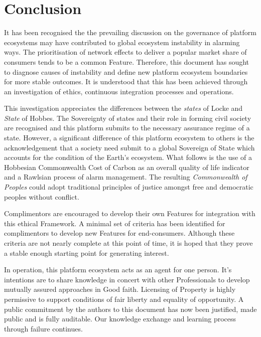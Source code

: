 \documentclass[11pt, oneside]{article}   	%
\begin{document}
\pagebreak

\section{Conclusion}
It has been recognised the the prevailing discussion on the governance of platform ecosystems may have contributed to global ecosystem instability in alarming ways.
The prioritisation of network effects to deliver a popular market share of consumers tends to be a common Feature.
Therefore, this document has sought to diagnose causes of instability and define new platform ecosystem boundaries for more stable outcomes.
It is understood that this has been achieved through an investigation of ethics, continuous integration processes and operations.\

This investigation appreciates the differences between the \emph{states} of Locke and \emph{State} of Hobbes.
The Sovereignty of states and their role in forming civil society are recognised and this platform submits to the necessary assurance regime of a state.
However, a significant difference of this platform ecosystem to others is the acknowledgement that a society need submit to a global Sovereign of State which accounts for the condition of the Earth's ecosystem.
What follows is the use of a Hobbesian Commonwealth Cost of Carbon as an overall quality of life indicator and a Rawlsian process of alarm management.
The resulting \emph{Commonwealth of Peoples} could adopt traditional principles of justice amongst free and democratic peoples without conflict.\

Complimentors are encouraged to develop their own Features for integration with this ethical Framework.
A minimal set of criteria has been identified for complimentors to develop new Features for end-consumers.
Although these criteria are not nearly complete at this point of time, it is hoped that they prove a stable enough starting point for generating interest.\

In operation, this platform ecosystem acts as an agent for one person.
It's intentions are to share knowledge in concert with other Professionals to develop mutually assured approaches in Good faith.
Licensing of Property is highly permissive to support conditions of fair liberty and equality of opportunity.
A public commitment by the authors to this document has now been justified, made public and is fully auditable.
Our knowledge exchange and learning process through failure continues.\

\pagebreak
\end{document}
